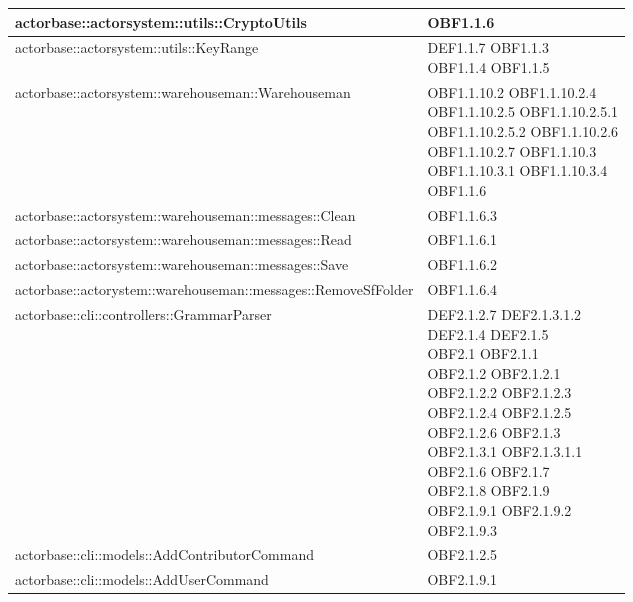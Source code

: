\documentclass{scalatekids-article}
\begin{document}
\begin{longtable}[H]{|p{12cm}|p{5.5cm}|}
\hline
actorbase::actorsystem::utils::CryptoUtils & \multiLineCell[t]{OBF1.1.6\\}\\
\hline
actorbase::actorsystem::utils::KeyRange & \multiLineCell[t]{DEF1.1.7 OBF1.1.3\\OBF1.1.4 OBF1.1.5\\}\\
\hline
actorbase::actorsystem::warehouseman::Warehouseman & \multiLineCell[t]{OBF1.1.10.2 OBF1.1.10.2.4\\OBF1.1.10.2.5 OBF1.1.10.2.5.1\\OBF1.1.10.2.5.2 OBF1.1.10.2.6\\OBF1.1.10.2.7 OBF1.1.10.3\\OBF1.1.10.3.1 OBF1.1.10.3.4\\OBF1.1.6}\\
\hline
actorbase::actorsystem::warehouseman::messages::Clean & \multiLineCell[t]{OBF1.1.6.3\\}\\
\hline
actorbase::actorsystem::warehouseman::messages::Read & \multiLineCell[t]{OBF1.1.6.1\\}\\
\hline
actorbase::actorsystem::warehouseman::messages::Save & \multiLineCell[t]{OBF1.1.6.2\\}\\
\hline
actorbase::actorystem::warehouseman::messages::RemoveSfFolder & \multiLineCell[t]{OBF1.1.6.4\\}\\
\hline
actorbase::cli::controllers::GrammarParser & \multiLineCell[t]{DEF2.1.2.7 DEF2.1.3.1.2\\DEF2.1.4 DEF2.1.5\\OBF2.1 OBF2.1.1\\OBF2.1.2 OBF2.1.2.1\\OBF2.1.2.2 OBF2.1.2.3\\OBF2.1.2.4 OBF2.1.2.5\\OBF2.1.2.6 OBF2.1.3\\OBF2.1.3.1 OBF2.1.3.1.1\\OBF2.1.6 OBF2.1.7\\OBF2.1.8 OBF2.1.9\\OBF2.1.9.1 OBF2.1.9.2\\OBF2.1.9.3}\\
\hline
actorbase::cli::models::AddContributorCommand & \multiLineCell[t]{OBF2.1.2.5\\}\\
\hline
actorbase::cli::models::AddUserCommand & \multiLineCell[t]{OBF2.1.9.1\\}\\

\end{longtable}
\end{document}
